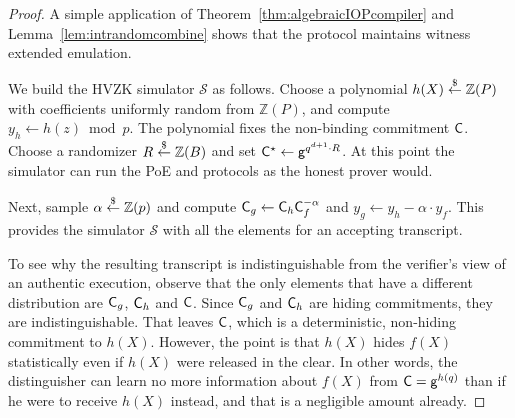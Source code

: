 \begin{proof}
A simple application of Theorem~\ref{thm:algebraicIOPcompiler} and Lemma~\ref{lem:intrandomcombine} shows that the protocol maintains witness extended emulation.   

We build the HVZK simulator $\mathcal{S}$ as follows. Choose a polynomial $h(X) \overset{\$}{\gets} \mathbb{Z}(P)$ with coefficients uniformly random from $\mathbb{Z}(P)$, and compute $y_h \gets h(z) \bmod p$. The polynomial fixes the non-binding commitment $\mathsf{C}$. Choose a randomizer $R \overset{\$}{\gets} \mathbb{Z}(B)$ and set $\mathsf{C}^\star \gets \mathsf{g}^{q^{d+1} \cdot R}$. At this point the simulator can run the \textsf{PoE} and \eval protocols as the honest prover would.

Next, sample $\alpha \overset{\$}{\gets} \mathbb{Z}(p)$ and compute $\mathsf{C}_g \gets \mathsf{C}_h \mathsf{C}_f^{-\alpha}$ and $y_g \gets y_h - \alpha \cdot y_f$. This provides the simulator $\mathcal{S}$ with all the elements for an accepting transcript.

To see why the resulting transcript is indistinguishable from the verifier's view of an authentic execution, observe that the only elements that have a different distribution are $\mathsf{C}_g$, $\mathsf{C}_h$ and $\mathsf{C}$. Since $\mathsf{C}_g$ and $\mathsf{C}_h$ are hiding commitments, they are indistinguishable. That leaves $\mathsf{C}$, which is a deterministic, non-hiding commitment to $h(X)$. However, the point is that $h(X)$ hides $f(X)$ statistically even if $h(X)$ were released in the clear. In other words, the distinguisher can learn no more information about $f(X)$ from $\mathsf{C} = \mathsf{g}^{h(q)}$ than if he were to receive $h(X)$ instead, and that is a negligible amount already.
\end{proof}